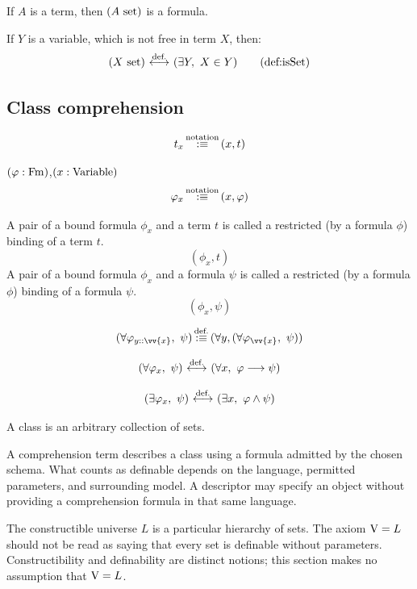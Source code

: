 \begin{constructor}
If $A$ is a term, then $(A\mathrm{\ set})$ is a formula.
\end{constructor}
\begin{definition}
If $Y$ is a variable, which is not free in term $X$, then:
\[
(X\set)
\iffdef
(\exists Y,\ X\in Y)
\labeltagd{def}{isSet}
\]
\end{definition}

\subsection{Class comprehension}
\begin{notation}
\[
t_x \,{\stackrel{{\textrm{notation}}}{:\equiv}}\, (x,t)
\]
\end{notation}
\begin{notation}
$(\varphi:\mathrm{Fm})$,$(x:\mathrm{Variable})$
\[
\varphi_x \,{\stackrel{{\textrm{notation}}}{:\equiv}}\, (x,\varphi)
\]
\end{notation}
\begin{notation}
A pair of a bound formula $\phi_x$ and a term $t$ is called a restricted (by a formula $\phi$) binding of a term $t$.
\[
(\phi_x,t)
\]
A pair of a bound formula $\phi_x$ and a formula $\psi$ is called a restricted (by a formula $\phi$) binding of a formula $\psi$.
\[
(\phi_x,\psi)
\]
\end{notation}

\[
(\forall \phi_{y::\vv{x}},\ \psi)
\equivdef
(\forall  y, (\forall \phi_{\vv{x}},\ \psi))
\]

\begin{definition}
\[
(\forall \varphi_{x},\ \psi)
\ {\stackrel{{\textrm{def.}}}{\longleftrightarrow}}\ 
(\forall x,\ \varphi \longrightarrow \psi)
\]
\end{definition}
\begin{definition}
\[
(\exists \varphi_{x},\ \psi)
\ {\stackrel{{\textrm{def.}}}{\longleftrightarrow}}\ 
(\exists x,\ \varphi \land \psi)
\]
\end{definition}
\begin{definition}[informal]
A class is an arbitrary collection of sets.
\end{definition}
\begin{note}
A comprehension term describes a class using a formula admitted by the
chosen schema. What counts as definable depends on the language, permitted
parameters, and surrounding model. A descriptor may specify an object
without providing a comprehension formula in that same language.
\end{note}
\begin{note}[constructibility]
The constructible universe $L$ is a particular hierarchy of sets. The axiom
$\mathrm{V}=L$ should not be read as saying that every set is definable without
parameters. Constructibility and definability are distinct notions; this
section makes no assumption that $\mathrm{V}=L$.
\end{note}

